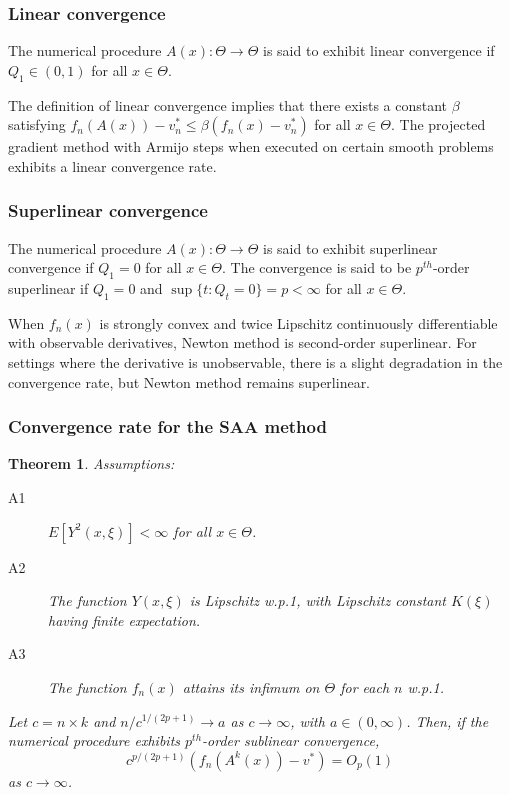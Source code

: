 \documentclass{beamer}
\newtheorem{theo}{Theorem}
\begin{document}
\begin{frame}
\frametitle{Linear convergence}

\begin{definition}
The numerical procedure $A(x) : \Theta \rightarrow \Theta$ is said to exhibit linear convergence if $Q_1 \in (0, 1)$ for all $x \in \Theta$.
\end{definition}

\mbox{}

The definition of linear convergence implies that there exists a constant $\beta$ satisfying $f_n ( A (x)) - v_n^* \leq \beta (f_n(x) - v_n^*)$ for all $x \in \Theta$.
The projected gradient method with Armijo steps when executed on certain smooth problems exhibits a linear convergence rate.

\end{frame}

\begin{frame}
\frametitle{Superlinear convergence}

\begin{definition}
The numerical procedure $A(x) : \Theta \rightarrow \Theta$ is said to exhibit superlinear convergence if $Q_1 = 0$ for all $x \in \Theta$.
The convergence is said to be $p^{th}$-order superlinear if $Q_1 = 0$ and $\sup \{ t : Q_t = 0 \} = p < \infty$ for all $x \in \Theta$.
\end{definition}

\mbox{}

When $f_n(x)$ is strongly convex and twice Lipschitz continuously differentiable with observable derivatives, Newton method is second-order superlinear.
For settings where the derivative is unobservable, there is a slight degradation in the convergence rate, but Newton method remains superlinear.

\end{frame}

\begin{frame}
\frametitle{Convergence rate for the SAA method}

\begin{theo}
	Assumptions:
	\begin{description}
		\item[A1]
$E[ Y^2 ( x , \xi)] < \infty$ for all $x \in \Theta$.
		\item[A2]
The function $Y(x, \xi)$ is Lipschitz w.p.1, with Lipschitz constant $K(\xi)$ having finite expectation.
		\item[A3]
The function $f_n(x)$ attains its infimum on $\Theta$ for each $n$ w.p.1.
	\end{description}
Let $c = n \times k$ and $n/c^{1 /( 2p + 1 )} \rightarrow a$ as $c \rightarrow \infty$, with $a \in (0, \infty)$.
Then, if the numerical procedure exhibits $p^{th}$-order sublinear convergence,
$$
c^{p /( 2p + 1 )} \left( f_n ( A^k ( x )) - v^* \right) = O_p(1)
$$
as $c \rightarrow \infty$.
\end{theo}

\end{frame}
\end{document}
